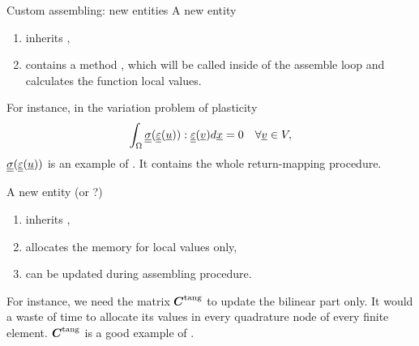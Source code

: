 \documentclass[9pt]{beamer}
\begin{document}
\begin{frame}{Custom assembling: new entities}
  A new entity 
  \begin{enumerate}
      \item inherits ,
      \item contains a method , which will be called inside of the assemble loop and calculates the function local values.
  \end{enumerate}
  For instance, in the variation problem of plasticity
  \begin{equation}
    \int_\Omega \underline{\underline{\sigma}}(\underline{\underline{\varepsilon}}(\underline{u})) : \underline{\underline{\varepsilon}}(\underline{v}) d\underline{x}  = 0 \quad \forall \underline{v} \in V,
  \end{equation}
  $\underline{\underline{\sigma}}(\underline{\underline{\varepsilon}}(\underline{u}))$ is an example of . It contains the whole return-mapping procedure.
  \newline

  A new entity  (or ?) 
  \begin{enumerate}
      \item inherits , 
      \item allocates the memory for local values only,
      \item can be updated during assembling procedure.
  \end{enumerate}
  For instance, we need the matrix $\mbox{\boldmath $C$}^\text{tang}$ to update the bilinear part only. It would a waste of time to allocate its values in every quadrature node of every finite element. $\mbox{\boldmath $C$}^\text{tang}$ is a good example of .
\end{frame}
\end{document}

